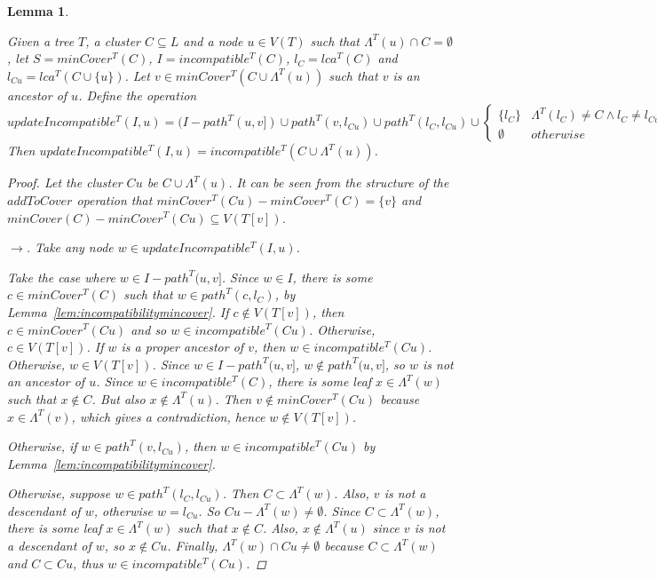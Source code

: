 \documentclass{article}
\newcommand{\leafset}{\Lambda}
\newtheorem{incompatibilityrecursive}[incompatibility]{Lemma}
\begin{document}
    \begin{incompatibilityrecursive}
        \label{lem:incompatibilityrecursive}

        Given a tree $T$, a cluster $C \subseteq L$ and a node $u \in V(T)$ such that $\leafset^{T}(u) \cap C = \emptyset$, let $S = minCover^{T}(C)$, $I = incompatible^{T}(C)$, $l_C = lca^{T}(C)$ and $l_{Cu} = lca^{T}(C \cup \{u\})$. Let $v \in minCover^{T}(C \cup \leafset^{T}(u))$ such that $v$ is an ancestor of $u$. Define the operation \[updateIncompatible^{T}(I, u) = (I - path^{T}(u, v]) \cup path^{T}(v, l_{Cu}) \cup path^{T}(l_C, l_{Cu}) \cup
        \begin{cases}
            \{l_C\} & \leafset^{T}(l_C) \neq C \wedge l_C \neq l_{Cu}\\
            \emptyset & otherwise
        \end{cases}\]
        Then $updateIncompatible^{T}(I, u) = incompatible^{T}(C \cup \leafset^{T}(u))$.

        \begin{proof}
            Let the cluster $Cu$ be $C \cup \leafset^{T}(u)$. It can be seen from the structure of the $addToCover$ operation that $minCover^{T}(Cu) - minCover^{T}(C) = \{v\}$ and $minCover(C) - minCover^{T}(Cu) \subseteq V(T[v])$.

            $\longrightarrow$. Take any node $w \in updateIncompatible^{T}(I, u)$.

            Take the case where $w \in I - path^{T}(u, v]$. Since $w \in I$, there is some $c \in minCover^{T}(C)$ such that $w \in path^{T}(c, l_{C})$, by Lemma~\ref{lem:incompatibilitymincover}. If $c \not\in V(T[v])$, then $c \in minCover^{T}(Cu)$ and so $w \in incompatible^{T}(Cu)$. Otherwise, $c \in V(T[v])$. If $w$ is a proper ancestor of $v$, then $w \in incompatible^{T}(Cu)$. Otherwise, $w \in V(T[v])$. Since $w \in I - path^{T}(u, v]$, $w \not\in path^{T}(u, v]$, so $w$ is not an ancestor of $u$. Since $w \in incompatible^{T}(C)$, there is some leaf $x \in \leafset^{T}(w)$ such that $x \not\in C$. But also $x \not\in \leafset^{T}(u)$. Then $v \not\in minCover^{T}(Cu)$ because $x \in \leafset^{T}(v)$, which gives a contradiction, hence $w \not\in V(T[v])$.

            Otherwise, if $w \in path^{T}(v, l_{Cu})$, then $w \in incompatible^{T}(Cu)$ by Lemma~\ref{lem:incompatibilitymincover}.

            Otherwise, suppose $w \in path^{T}(l_C, l_{Cu})$. Then $C \subset \leafset^{T}(w)$. Also, $v$ is not a descendant of $w$, otherwise $w = l_{Cu}$. So $Cu - \leafset^{T}(w) \neq \emptyset$. Since $C \subset \leafset^{T}(w)$, there is some leaf $x \in \leafset^{T}(w)$ such that $x \not\in C$. Also, $x \not\in \leafset^{T}(u)$ since $v$ is not a descendant of $w$, so $x \not\in Cu$. Finally, $\leafset^{T}(w) \cap Cu \neq \emptyset$ because $C \subset \leafset^{T}(w)$ and $C \subset Cu$, thus $w \in incompatible^{T}(Cu)$.


\end{proof}
\end{incompatibilityrecursive}
\end{document}
